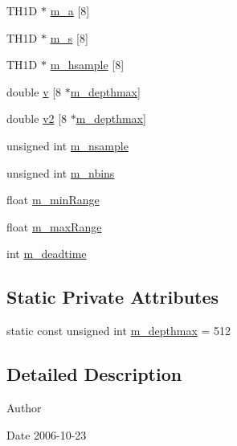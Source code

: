 \begin{DoxyCompactItemize}
\item 
TH1D $\ast$ \hyperlink{classAcquisition_a88963f722bfcde824882f6312a44e825}{m\_\-a} \mbox{[}8\mbox{]}
\item 
TH1D $\ast$ \hyperlink{classAcquisition_a15d71455f658e21a12ef4c153c21df65}{m\_\-s} \mbox{[}8\mbox{]}
\item 
TH1D $\ast$ \hyperlink{classAcquisition_a53bcc000575de30eba6b7db8209be2cc}{m\_\-hsample} \mbox{[}8\mbox{]}
\item 
double \hyperlink{classAcquisition_a8f0ef9898c1e63fb6f13c14508d3180d}{v} \mbox{[}8 $\ast$\hyperlink{classAcquisition_a7d95ba9a5593451a73754ed44f6bcd1c}{m\_\-depthmax}\mbox{]}
\item 
double \hyperlink{classAcquisition_a841316dcf4f210ad52b144b187f2b7b6}{v2} \mbox{[}8 $\ast$\hyperlink{classAcquisition_a7d95ba9a5593451a73754ed44f6bcd1c}{m\_\-depthmax}\mbox{]}
\item 
unsigned int \hyperlink{classAcquisition_a26d0f1a44309ffac49c365b7ee568ab2}{m\_\-nsample}
\item 
unsigned int \hyperlink{classAcquisition_a05bccdc4b9ada37beaeba8794ccef12d}{m\_\-nbins}
\item 
float \hyperlink{classAcquisition_a06b3ea027ebdcb15f64a6517ceb99b76}{m\_\-minRange}
\item 
float \hyperlink{classAcquisition_a45478629e9db582470b4b158edb46616}{m\_\-maxRange}
\item 
int \hyperlink{classAcquisition_a5f7fe20506e7d860ed61935255adfe17}{m\_\-deadtime}
\end{DoxyCompactItemize}
\subsection*{Static Private Attributes}
\begin{DoxyCompactItemize}
\item 
static const unsigned int \hyperlink{classAcquisition_a7d95ba9a5593451a73754ed44f6bcd1c}{m\_\-depthmax} = 512
\end{DoxyCompactItemize}


\subsection{Detailed Description}
\begin{DoxyAuthor}{Author}

\end{DoxyAuthor}
\begin{DoxyDate}{Date}
2006-\/10-\/23 
\end{DoxyDate}


